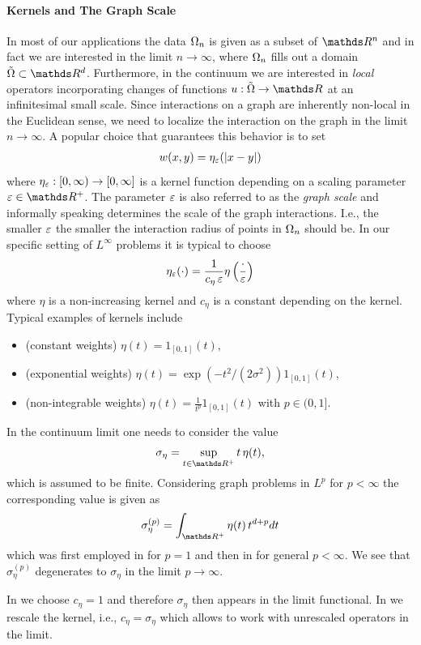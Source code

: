 \paragraph{Kernels and The Graph Scale} 
In most of our applications the data $\Omega_n$ is given as a subset of $\R^n$ and in fact we are interested in the limit $n\to\infty$, where $\Omega_n$ fills out a domain $\tilde\domain\subset\R^d$. Furthermore, in the continuum we are interested in \emph{local} operators incorporating changes of functions $u:\tilde\domain\to\R$ at an infinitesimal small scale. Since interactions on a graph are inherently non-local in the Euclidean sense, we need to localize the interaction on the graph in the limit $n\to\infty$. A popular choice that guarantees this behavior is to set
%
\begin{align*}
w(x,y) = \eta_{\varepsilon}(\left|x-y\right|)
\end{align*}
%
where $\eta_\varepsilon:[0,\infty)\to [0,\infty]$ is a kernel function depending on a scaling parameter $\gscale\in\R^+$. The parameter $\varepsilon$ is also referred to as the \emph{graph scale} and informally speaking determines the scale of the graph interactions. I.e., the smaller $\varepsilon$ the smaller the interaction radius of points in $\Omega_n$ should be. In our specific setting of $L^\infty$ problems it is typical to choose
%
\begin{align*}
\eta_\varepsilon(\cdot) = \frac{1}{c_\eta\, \varepsilon} \eta\left(\frac{\cdot}{\varepsilon}\right)
\end{align*}
%
where $\eta$ is a non-increasing kernel and $c_\eta$ is a constant depending on the kernel. Typical examples of kernels include
%
\begin{itemize}
\item (constant weights) $\eta(t)=1_{[0,1]}(t)$,
\item (exponential weights) $\eta(t)=\exp(-t^2/(2\sigma^2))1_{[0,1]}(t)$,
\item (non-integrable weights) $\eta(t)=\frac{1}{t^p}1_{[0,1]}(t)$ with $p\in(0,1]$.
\end{itemize}
%
%
\begin{remark}{}{}
In the continuum limit one needs to consider the value 
%
\begin{align*}
\sigma_\eta = \sup_{t\in\R^+} t\, \eta(t),
\end{align*}
%
which is assumed to be finite. Considering graph problems in $L^p$ for $p<\infty$
the corresponding value is given as
%
\begin{align*}
\sigma_\eta^{(p)} = \int_{\R^+} \eta(t)\, t^{d+p} dt
\end{align*}
%
which was first employed in \cite{GarcSlep15} for $p=1$ and then in \cite{slepcev2019analysis} for general $p<\infty$. We see that $\sigma_\eta^{(p)}$ degenerates to $\sigma_\eta$ in the limit $p\to\infty$.

In \cite{roith2022continuum} we choose $c_\eta=1$ and therefore $\sigma_\eta$ then appears in the limit functional. In \cite{bungert2021uniform} we rescale the kernel, i.e., $c_\eta = \sigma_\eta$ which allows to work with unrescaled operators in the limit. 
\end{remark}
